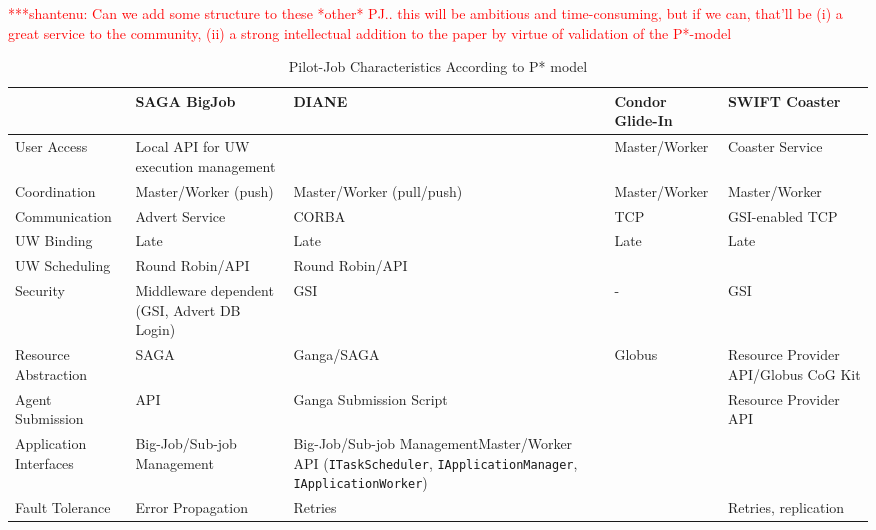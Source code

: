 \documentclass[conference,final]{IEEEtran}
\newcommand{\jhanote}[1]{ {\textcolor{red} { ***shantenu: #1 }}}
\newcommand{\jhanote}[1]{}
\begin{document}
\jhanote{Can we add some structure to these *other* PJ.. this will be
  ambitious and time-consuming, but if we can, that'll be (i) a great
  service to the community, (ii) a strong intellectual addition to the
  paper by virtue of validation of the P*-model}


\begin{table}[t]
\centering
\begin{tabular}{|l|p{2.5cm}|p{2.5cm}|p{2.5cm}|p{2.5cm}|}
	\hline
	&\textbf{SAGA BigJob} &\textbf{DIANE} &\textbf{Condor Glide-In} &   
	\textbf{SWIFT Coaster} \\ \hline
User Access &Local API for UW execution management & &Master/Worker &Coaster Service\\ \hline

Coordination &Master/Worker (push) &Master/Worker (pull/push) &Master/Worker &Master/Worker \\ \hline
	
Communication &Advert Service &CORBA &TCP &GSI-enabled TCP \\ \hline

UW Binding &Late &Late &Late &Late\\
\hline
UW Scheduling &Round Robin/API &Round Robin/API &&\\
\hline

Security &Middleware dependent (GSI, Advert DB Login) &GSI &- &GSI\\ \hline

Resource Abstraction &SAGA &Ganga/SAGA &Globus &Resource Provider API/Globus CoG 
Kit \\ 
\hline
Agent Submission &API &Ganga Submission Script & &Resource Provider API\\
\hline
Application Interfaces &Big-Job/Sub-job Management &Big-Job/Sub-job 
Management\linebreak[4] Master/Worker API (\texttt{ITaskScheduler}, 
\texttt{IApplicationManager}, \texttt{IApplicationWorker}) &&\\
\hline
Fault Tolerance &Error Propagation &Retries & &Retries, replication\\
\hline
	
\end{tabular}
\caption{Pilot-Job Characteristics According to P* model}\label{table:pilot-job-comparison}
\end{table}
\end{document}
